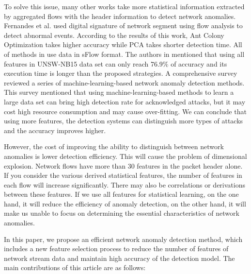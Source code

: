 \documentclass{ieeeaccess}
\theoremstyle{definition}
\begin{document}
To solve this issue, many other works take more statistical information extracted by aggregated flows with the header information to detect network anomalies. Fernandes et al.\cite{Fernandes2015} used digital signature of network segment using flow analysis to detect abnormal events. According to the results of this work, Ant Colony Optimization takes higher accuracy while PCA takes shorter detection time. All of methods in \cite{Fernandes2015} use data in sFlow format. The authors in \cite{Anwer2018} mentioned that using all features in UNSW-NB15 data set \cite{UNSW-2015} can only reach 76.9\% of accuracy and its execution time is longer than the proposed strategies. A comprehensive survey \cite{Fernandes2019} reviewed a series of machine-learning-based network anomaly detection methods. This survey mentioned that using machine-learning-based methods to learn a large data set can bring high detection rate for acknowledged attacks, but it may cost high resource consumption and may cause over-fitting. We can conclude that using more features, the detection systems can distinguish more types of attacks and the accuracy improves higher.

However, the cost of improving the ability to distinguish between network anomalies is lower detection efficiency. This will cause the problem of dimensional explosion. Network flows have more than 30 features in the packet header alone. If you consider the various derived statistical features, the number of features in each flow will increase significantly. There may also be correlations or derivations between these features. If we use all features for statistical learning, on the one hand, it will reduce the efficiency of anomaly detection, on the other hand, it will make us unable to focus on determining the essential characteristics of network anomalies.

In this paper, we propose an efficient network anomaly detection method, which includes a new feature selection process to reduce the number of features of network stream data and maintain high accuracy of the detection model. The main contributions of this article are as follows:
\end{document}
